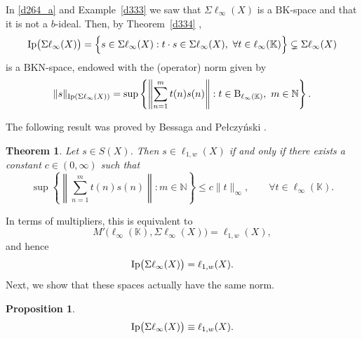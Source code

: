 \documentclass[14pt, a4paper]{article}  %
\providecommand{\llave}[1]{\left\lbrace #1\right\rbrace }
\providecommand{\norm}[1]{\left\lVert#1\right\rVert}
\newcommand{\K}{\mathbb{K}}
\newcommand{\N}{\mathbb{N}}
\newcommand{\BK}{\text{BK}}
\newcommand{\BKa}{\text{BKN}}
\newcommand{\B}{\textup{B}}
\newtheorem{proposition}{Proposition}[section]
\newtheorem{theorem}{Theorem}[section]
\begin{document}
In \eqref{d264_a} and Example~\ref{d333} we saw that $\Sigma \ell_{\infty}(X)$ is a $\BK$-space and that it is not a  $b$-ideal. Then, by Theorem~\ref{d334} , 
\begin{equation}
	\textup{Ip}\big(\Sigma \ell_{\infty}(X)\big)
	=
	\Big\{ s \in \Sigma \ell_{\infty}(X) : t \cdot s \in \Sigma \ell_{\infty}(X),\ \forall t \in \ell_{\infty}(\K) \Big\}
	\subsetneq \Sigma \ell_{\infty}(X)
\end{equation}
is a $\BKa$-space, endowed with the (operator) norm  given by
\begin{equation}
	\|s\|_{\textup{Ip}(\Sigma \ell_{\infty}(X))}
	=
	\sup\llave{ \norm{ \sum_{n=1}^{m} t(n)s(n) } : t \in \B_{\ell_{\infty}(\K)},\ m \in \N }.
\end{equation}

The following result was proved by Bessaga and Pełczyński \cite[Lemma~2]{BP}.

\begin{theorem}
	Let $s \in S(X)$. Then $s \in \ell_{1,w}(X)$ if and only if there exists a constant $c \in (0,\infty)$ such that
\begin{equation}
	\sup\llave{ \norm{ \sum_{n=1}^{m} t(n)s(n) } : m \in \N }
	\le c \|t\|_{\infty},
	\qquad \forall t \in \ell_{\infty}(\K).
\end{equation}
\end{theorem}

In terms of multipliers,  this is equivalent to
\begin{equation}\label{final10}
	M'\big(\ell_{\infty}(\K), \Sigma \ell_{\infty}(X)\big)
	=
	\ell_{1,w}(X),
\end{equation}
and hence
\begin{equation}
	\textup{Ip}\big(\Sigma \ell_{\infty}(X)\big)
	=
	\ell_{1,w}(X).
\end{equation}
Next, we show that these spaces actually have the same norm.

\begin{proposition}\label{naty3}\label{lola215_0}
	\[
	\textup{Ip}\big(\Sigma \ell_{\infty}(X)\big) \equiv \ell_{1,w}(X).
	\]
\end{proposition}
\end{document}
